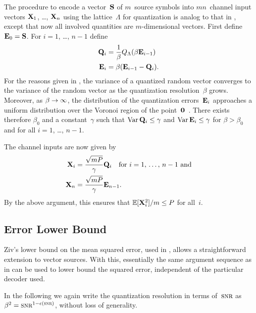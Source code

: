The procedure to encode a vector~$\S$ of $m$~source symbols into $mn$~channel
input vectors $\X_1$, \ldots, $\X_n$ using the lattice~$\Lambda$ for
quantization is analog to that in , except that now all
involved quantities are $m$-dimensional vectors. First define $\Evc_0 = \S$.
For $i = 1$, \ldots, $n-1$ define
\begin{align}
  \Q_i &= \frac{1}{\beta} \QL(\beta \Evc_{i-1})  \nonumber \\
  \Evc_i &= \beta ( \Evc_{i-1} - \Q_i). \label{eq:latticeQE}
\end{align}
For the reasons given in , the variance of a quantized
random vector converges to the variance of the random vector as the quantization
resolution~$\beta$ grows. Moreover, as $\beta \goesto \infty$, the distribution
of the quantization errors~$\Evc_i$ approaches a uniform distribution over the
Voronoi region of the point~$\vz$~\cite{ZamirF1996}. There exists therefore
$\beta_0$ and a constant~$\gamma$ such that $\Var \Q_i \le \gamma$ and
$\Var \Evc_i \le \gamma$  for $\beta > \beta_0$ and for all $i = 1$, \ldots,
$n-1$. 

The channel inputs are now given by
\begin{align*}
  \X_i &= \frac{\sqrt{mP}}{\gamma} \Q_i \quad \text{for $i = 1$, \dots, $n-1$ and}
  \\
  \X_n &= \frac{\sqrt{mP}}{\gamma} \Evc_{n-1}.
\end{align*}
By the above argument, this ensures that $\E[\X_i^2]/m \le P$ for all~$i$.



\subsection{Error Lower Bound}

Ziv's lower bound on the mean squared error, used in ,
allows a straightforward extension to vector sources. With this, essentially the
same argument sequence as in  can be used to lower bound the
squared error, independent of the particular decoder used.

In the following we again write the quantization resolution in terms of~$\snr$
as $\beta^2 = \snr^{1-\e(\snr)}$, without loss of generality.

